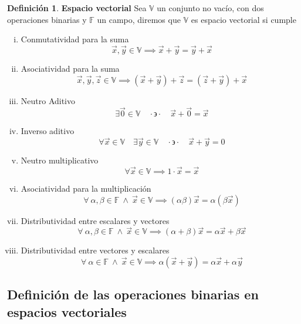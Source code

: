 \documentclass[letterpaper]{article}
\newcommand{\V}{\mathds{V}}
\newcommand{\F}{\mathds{F}}
\newcommand{\tq}{ \quad \cdot  \backepsilon \cdot \quad }
\renewcommand{\*}{\cdot}
\theoremstyle{definition}
\newtheorem{definition}{Definición}[section]
\begin{document}
	\begin{definition}
		\textbf{Espacio vectorial} Sea $ \V $ un conjunto  no vacío, con dos operaciones binarias y $ \F $ un campo, diremos que $ \V $ es espacio vectorial si cumple
		\begin{enumerate}[(i)]
			\item Conmutatividad para la suma
			\[ \vec{x}, \vec{y} \in \V \implies \vec{x} + \vec{y} = \vec{y} + \vec{x} \]
			\item Asociatividad para la suma
			\[ \vec{x},\vec{y},\vec{z} \in \V \implies (\vec{x} + \vec{y}) + \vec{z} = ( \vec{z} + \vec{y}) + \vec{x}  \]
			\item Neutro Aditivo
			\[ \exists \vec{0}\in \V \tq \vec{x} + \vec{0} = \vec{x} \]
			\item Inverso aditivo 
			\[\forall \vec{x} \in \V \quad \exists \vec{y} \in \V \tq \vec{x} + \vec{y} = 0 \]
			\item Neutro multiplicativo
			\[\forall \vec{x} \in \V \implies 1\* \vec{x} = \vec{x} \]
			\item Asociatividad para la multiplicación
			\[ \forall \ \alpha, \beta \in \F \ \land \ \vec{x} \in \V \implies (\alpha \beta)\vec{x} = \alpha(\beta \vec{x}) \]
			\item Distributividad entre escalares y vectores
			\[  \forall \ \alpha, \beta \in \F \ \land \ \vec{x} \in \V \implies (\alpha + \beta)\vec{x} = \alpha \vec{x} + \beta \vec{x} \]
			\item Distributividad entre vectores y escalares
			\[  \forall \ \alpha \in \F \ \land \ \vec{x} \in \V \implies \alpha (\vec{x} + \vec{y}) = \alpha \vec{x} + \alpha \vec{y} \]	
		\end{enumerate}
	\end{definition}
	\subsection{Definición de las operaciones binarias en espacios vectoriales}
\newpage
	
\end{document}
